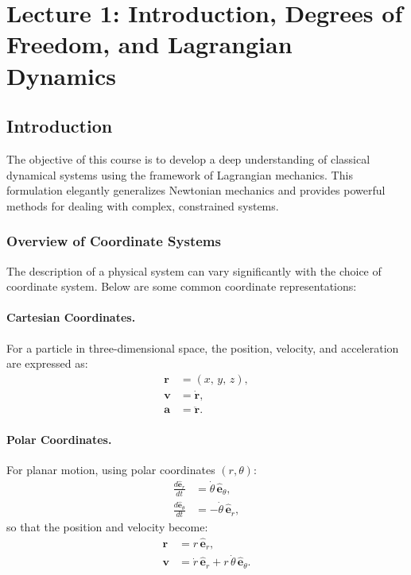 \setcounter{section}{0}

\section{Lecture 1: Introduction, Degrees of Freedom, and Lagrangian Dynamics}

\subsection{Introduction}

The objective of this course is to develop a deep understanding of classical dynamical systems using the framework of Lagrangian mechanics. This formulation elegantly generalizes Newtonian mechanics and provides powerful methods for dealing with complex, constrained systems.

\subsubsection*{Overview of Coordinate Systems}

The description of a physical system can vary significantly with the choice of coordinate system. Below are some common coordinate representations:

\paragraph{Cartesian Coordinates.}  
For a particle in three-dimensional space, the position, velocity, and acceleration are expressed as:
\begin{equation}
    \begin{aligned}
        \mathbf{r} &= (x,\, y,\, z), \\
        \mathbf{v} &= \dot{\mathbf{r}}, \\
        \mathbf{a} &= \ddot{\mathbf{r}}.
    \end{aligned}
\end{equation}

\paragraph{Polar Coordinates.}  
For planar motion, using polar coordinates $(r,\theta)$:
\begin{equation}
    \begin{aligned}
        \frac{d\hat{\mathbf{e}}_r}{dt} &= \dot{\theta}\,\hat{\mathbf{e}}_\theta, \\
        \frac{d\hat{\mathbf{e}}_\theta}{dt} &= -\dot{\theta}\,\hat{\mathbf{e}}_r,
    \end{aligned}
\end{equation}
so that the position and velocity become:
\begin{equation}
    \begin{aligned}
        \mathbf{r} &= r\,\hat{\mathbf{e}}_r, \\
        \mathbf{v} &= \dot{r}\,\hat{\mathbf{e}}_r + r\,\dot{\theta}\,\hat{\mathbf{e}}_\theta.
    \end{aligned}
\end{equation}

